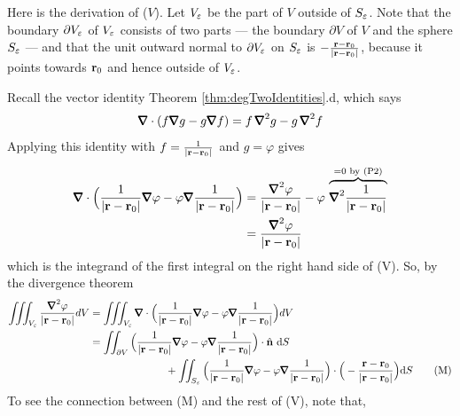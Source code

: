 Here is the derivation of ($V$). Let $V_\varepsilon$ be the part of $V$ outside
of $S_\varepsilon$. 
Note that the boundary $\partial V_\varepsilon$ of $V_\varepsilon$ consists
of two parts --- the boundary $\partial V$ of $V$ and the sphere $S_\varepsilon$
--- and that the unit outward normal to $\partial V_\varepsilon$ on $S_\varepsilon$ is
$-\frac{\mathbf{r}-\mathbf{r}_0}{|\mathbf{r}-\mathbf{r}_0|}$, because it points towards $\mathbf{r}_0$ and hence
outside of $V_\varepsilon$.


Recall the vector identity Theorem \ref{thm:degTwoIdentities}.d, which says
\begin{equation*}
\vnabla\cdot(f\vnabla g-g\vnabla f)=f\,\vnabla^2g-g\,\vnabla^2f
\end{equation*}
Applying this identity with $f= \frac{1}{|\mathbf{r}-\mathbf{r}_0|}$ and $g=\varphi$
gives
\begin{align*}
\vnabla\cdot\Big(\frac{1}{|\vr-\vr_0|}\vnabla\varphi
-\varphi\vnabla\frac{1}{|\vr-\vr_0|}\Big)
&=\frac{\vnabla^2\varphi}{|\vr-\vr_0|}
  -\varphi\,\overbrace{ \vnabla^2\frac{1}{|\vr-\vr_0|} }^{=0\text{ by (P2)}} \\
&=\frac{\vnabla^2\varphi}{|\vr-\vr_0|}
\end{align*}
which is the integrand of the first integral on the right hand side of (V). 
So, by the divergence theorem
\begin{align}
\tripInt_{V_\veps} \frac{\vnabla^2\varphi}{|\vr-\vr_0|} dV
&=\tripInt_{V_\veps}\vnabla\cdot\Big(\frac{1}{|\vr-\vr_0|}\vnabla\varphi
-\varphi\vnabla\frac{1}{|\vr-\vr_0|}\Big) dV \notag\\
&=\dblInt_{\partial V}\Big(\frac{1}{|\vr-\vr_0|}\vnabla\varphi
-\varphi\vnabla\frac{1}{|\vr-\vr_0|}\Big)\cdot\hn\ \dee{S}  \notag\\
&\hskip1in+\dblInt_{S_\veps}\Big(\frac{1}{|\vr-\vr_0|}\vnabla\varphi
-\varphi\vnabla\frac{1}{|\vr-\vr_0|}\Big)\cdot
\Big(-\frac{\vr-\vr_0}{|\vr-\vr_0|}\Big) \dee{S}
\tag{M}\end{align}
To see the connection between (M) and the rest of (V), note that, 

